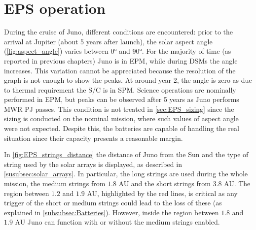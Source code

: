 \section{EPS operation}
\label{sec:eps_ops}

During the cruise of Juno, different conditions are encountered: prior to the arrival at Jupiter (about 5 years after launch), the solar aspect angle (\autoref{fig:aspect_angle}) varies between 0° and 90°.
For the majority of time (as reported in previous chapters) Juno is in EPM, while during DSMs the angle increases.
This variation cannot be appreciated because the resolution of the graph is not enough to show the peaks.
At around year 2, the angle is zero as due to thermal requirement the S/C is in SPM.
Science operations are nominally performed in EPM, but peaks can be observed after 5 years as Juno performs MWR PJ passes.
This condition is not treated in \autoref{sec:EPS_sizing} since the sizing is conducted on the nominal mission, where such values of aspect angle were not expected. Despite this, the batteries are capable of handling the real situation since their capacity presents a reasonable margin.

In \autoref{fig:EPS_strings_distance} the distance of Juno from the Sun and the type of string used by the solar arrays is displayed, as described in \autoref{susubsec:solar_arrays}.
In particular, the long strings are used during the whole mission, the medium strings from $1.8$ AU and the short strings from $3.8$ AU.
The region between $1.2$ and $1.9$ AU, highlighted by the red lines, is critical as any trigger of the short or medium strings could lead to the loss of these (as explained in \autoref{subsubsec:Batteries}). However, inside the region between $1.8$ and $1.9$ AU Juno can function with or without the medium strings enabled.\cite{solar_panels_coef}

\vspace*{-3mm}
